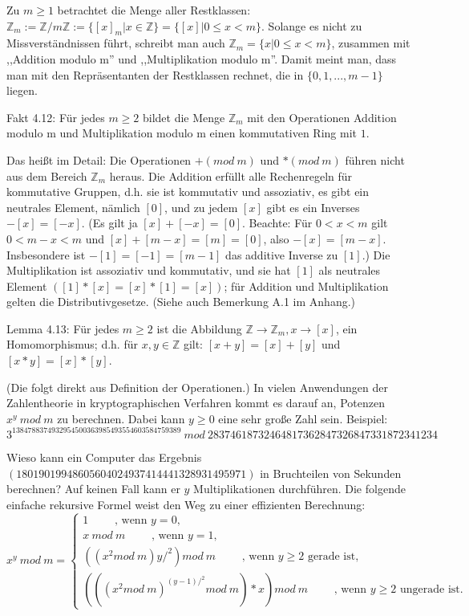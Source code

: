 \documentclass[a4paper]{article}
\begin{document}
\begin{multicols}{3}
    Zu $m\geq 1$ betrachtet die Menge aller Restklassen: $\mathbb{Z}_m:=\mathbb{Z}/m\mathbb{Z}:=\{[x]_m|x\in\mathbb{Z}\}=\{[x]| 0 \leq x<m\}$. Solange es nicht zu Missverständnissen führt, schreibt man auch $\mathbb{Z}_m=\{x|0 \leq x < m\}$, zusammen mit ,,Addition modulo m'' und ,,Multiplikation modulo m''. Damit meint man, dass man mit den Repräsentanten der Restklassen rechnet, die in $\{0,1 ,...,m-1\}$ liegen.

    Fakt 4.12: Für jedes $m\geq 2$ bildet die Menge $\mathbb{Z}_m$ mit den Operationen Addition modulo m und Multiplikation modulo m einen kommutativen Ring mit $1$.

    Das heißt im Detail: Die Operationen $+(mod\ m)$ und $*(mod\ m)$ führen nicht aus dem Bereich $\mathbb{Z}_m$ heraus. Die Addition erfüllt alle Rechenregeln für kommutative Gruppen, d.h. sie ist kommutativ und assoziativ, es gibt ein neutrales Element, nämlich $[0]$, und zu jedem $[x]$ gibt es ein Inverses $-[x]=[-x]$. (Es gilt ja $[x] + [-x] = [0]$. Beachte: Für $0 < x < m$ gilt $0< m-x < m$ und $[x]+[m-x]=[m]=[0]$, also $-[x]=[m-x]$. Insbesondere ist $-[1]=[-1]=[m-1]$ das additive Inverse zu $[1]$.) Die Multiplikation ist assoziativ und kommutativ, und sie hat $[1]$ als neutrales Element $([1]*[x] = [x]*[1] = [x])$; für Addition und Multiplikation gelten die Distributivgesetze. (Siehe auch Bemerkung A.1 im Anhang.)

    Lemma 4.13: Für jedes $m\geq 2$ ist die Abbildung $\mathbb{Z}\rightarrow\mathbb{Z}_m ,x\rightarrow [x]$, ein Homomorphismus; d.h. für $x,y\in\mathbb{Z}$ gilt: $[x+y]=[x]+[y]$ und $[x*y] = [x]*[y]$.

    (Die folgt direkt aus Definition der Operationen.)
    In vielen Anwendungen der Zahlentheorie in kryptographischen Verfahren kommt es darauf an, Potenzen $x^y\ mod\ m$ zu berechnen. Dabei kann $y\geq 0$ eine sehr große Zahl sein. Beispiel: $3^{1384788374932954500363985493554603584759389}\ mod\ 28374618732464817362847326847331872341234$

    Wieso kann ein Computer das Ergebnis $(18019019948605604024937414441328931495971)$ in Bruchteilen von Sekunden berechnen? Auf keinen Fall kann er $y$ Multiplikationen durchführen. Die folgende einfache rekursive Formel weist den Weg zu einer effizienten Berechnung:
    $$x^y\ mod\ m=\begin{cases} 1\quad\quad\text{ , wenn } y=0,\\ x\ mod\ m\quad\quad\text{ , wenn } y= 1,\\ ((x^2 mod\ m)y/^2 ) mod\ m\quad\quad\text{ , wenn } y\geq 2 \text{ gerade ist},\\ (((x^2 mod\ m)^{(y-1)/^2} mod\ m)*x) mod\ m\quad\quad\text{ , wenn } y\geq 2 \text{ ungerade ist}.\end{cases}$$


\end{multicols}
\end{document}
